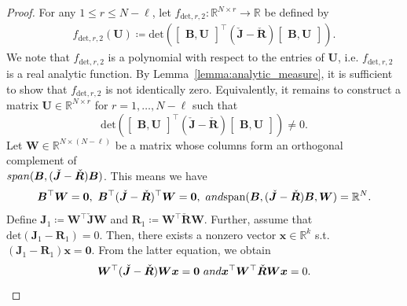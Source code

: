 \documentclass[10pt,a4paper]{amsart}
\newcommand{\FOMsize}{N}
\newcommand{\Jcheck}{\check{\bmJ}}
\newcommand{\R}{\mathbb{R}}
\newcommand{\ROMsize}{r}
\newcommand{\Rcheck}{\check{\bmR}}
\newcommand{\bmB}{\bm{B}}
\newcommand{\bmJ}{\bm{J}}
\newcommand{\bmR}{\bm{R}}
\newcommand{\bmU}{\bm{U}}
\newcommand{\bmW}{\bm{W}}
\newcommand{\bzero}{\mathbf{0}}
\newcommand{\statex}{{\bm x}}
\begin{document}
\begin{proof}
For any $1\le\ROMsize\leq \FOMsize-\ell$, let $f_{\mathrm{det},\ROMsize,2}\colon\R^{\FOMsize\times\ROMsize}\rightarrow \R$ be defined by 
			\begin{align*}
				f_{\mathrm{det},\ROMsize,2}(\bmU)\coloneq \mathrm{det}\left(\begin{bmatrix} \bmB,\bmU \end{bmatrix}^{\top} \left(\Jcheck-\Rcheck\right) \begin{bmatrix} \bmB,\bmU \end{bmatrix}\right).
			\end{align*}
We note that $f_{\mathrm{det},\ROMsize,2}$ is a polynomial with respect to the entries of $\bmU$, i.e. $f_{\mathrm{det},\ROMsize,2}$ is a real analytic function. By Lemma~\ref{lemma:analytic_measure}, it is sufficient to show that $f_{\mathrm{det},\ROMsize,2}$ is not identically zero. Equivalently, it remains to construct a matrix  $ \bmU\in\R^{\FOMsize\times \ROMsize} $ for $\ROMsize=1,\ldots,\FOMsize-\ell$ such that
			\begin{equation*}
				\mathrm{det}\left(\begin{bmatrix} \bmB,\bmU \end{bmatrix}^{\top} \left(\Jcheck-\Rcheck\right) \begin{bmatrix} \bmB,\bmU \end{bmatrix}\right) \neq 0. 
\end{equation*}
Let $\bmW\in\R^{\FOMsize\times(\FOMsize-\ell)}$ be a matrix whose columns form an orthogonal complement of \\$\textnormal{span}(\bmB,(\Jcheck-\Rcheck)\bmB)$. 
			This means we have 
			\begin{align}
				\label{equ:exists_JR_inv_BVbar_orth_comp}
				\bmB^\top\bmW = \bm{0},\
				\bmB^\top (\Jcheck-\Rcheck)^\top \bmW = \bm{0},\ \textnormal{ and }
				\mathrm{span}(
					\bmB, (\Jcheck-\Rcheck)\bmB, \bmW
				) =\R^{\FOMsize}.
			\end{align}
			Define
			$
			\bmJ_1 \coloneq  \bmW^{\top}\Jcheck\bmW$ and
			$\bmR_1 \coloneq  \bmW^{\top}\Rcheck\bmW.
			$
			Further, assume that $\mathrm{det}(\bmJ_1-\bmR_1)= 0$. Then, there exists a nonzero vector $\statex\in\R^k$ s.t.
				$(\bmJ_1-\bmR_1)\statex = \bzero$.
			From the latter equation, we obtain
			\begin{equation}
				\label{equ:GMG_exist_Orth_cond}
				\bmW^\top (\Jcheck-\Rcheck)\bmW\statex =\bm{0}\ \textnormal{ and }
				\statex^{\top}\bmW^{\top}\Rcheck\bmW\statex\allowbreak= 0.

\end{equation}
\end{proof}
\end{document}
